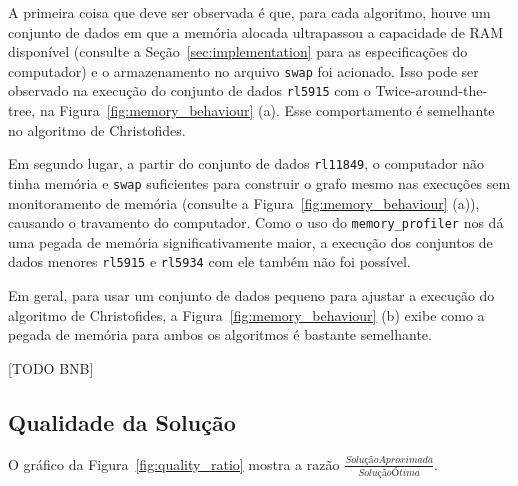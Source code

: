 A primeira coisa que deve ser observada é que, para cada algoritmo, houve um conjunto de dados em que a memória alocada ultrapassou a capacidade de RAM disponível (consulte a Seção~\ref{sec:implementation} para as especificações do computador) e o armazenamento no arquivo \texttt{swap} \footnotemark foi acionado. Isso pode ser observado na execução do conjunto de dados \texttt{rl5915} com o Twice-around-the-tree, na Figura~\ref{fig:memory_behaviour} (a). Esse comportamento é semelhante no algoritmo de Christofides.


Em segundo lugar, a partir do conjunto de dados \texttt{rl11849}, o computador não tinha memória e \texttt{swap} suficientes para construir o grafo mesmo nas execuções sem monitoramento de memória (consulte a Figura~\ref{fig:memory_behaviour} (a)), causando o travamento do computador\footnotemark. Como o uso do \texttt{memory\_profiler} nos dá uma pegada de memória significativamente maior, a execução dos conjuntos de dados menores \texttt{rl5915} e \texttt{rl5934} com ele também não foi possível.


Em geral, para usar um conjunto de dados pequeno para ajustar a execução do algoritmo de Christofides, a Figura~\ref{fig:memory_behaviour} (b) exibe como a pegada de memória para ambos os algoritmos é bastante semelhante.

[TODO BNB]

\subsection{Qualidade da Solução} \label{sec:exp_quality}

O gráfico da Figura~\ref{fig:quality_ratio} mostra a razão $\frac{Solução Aproximada}{Solução Ótima}$.

